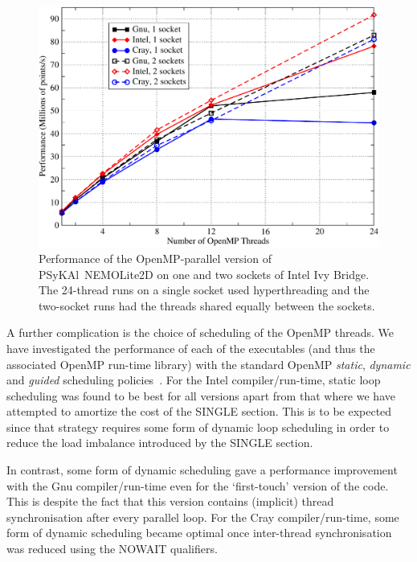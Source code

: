 \documentclass[journal]{IEEEtran}
\newlength{\picwidth}
\newcommand{\psykal}{{PS}y{KA}l}
\begin{document}
\begin{figure}
\centering
\includegraphics[width=\picwidth]{1and2sockets}
\caption{Performance of the OpenMP-parallel version of \psykal\
  NEMOLite2D on one and two sockets of Intel Ivy Bridge. The 24-thread
  runs on a single socket used hyperthreading and the two-socket runs
  had the threads shared equally between the sockets.}
\label{FIG_omp_2socks}
\end{figure}

A further complication is the choice of scheduling of the OpenMP
threads.  We have investigated the performance of each of the
executables (and thus the associated OpenMP run-time library) with the
standard OpenMP {\it static}, {\it dynamic} and {\it guided}
scheduling policies~\cite{openmp_standard}. For the Intel
compiler/run-time, static loop scheduling was found to be best for all
versions apart from that where we have attempted to amortize the cost
of the SINGLE section. This is to be expected since that strategy
requires some form of dynamic loop scheduling in order to reduce the
load imbalance introduced by the SINGLE section.

In contrast, some form of dynamic scheduling gave a performance
improvement with the Gnu compiler/run-time even for the `first-touch'
version of the code. This is despite the fact that this version
contains (implicit) thread synchronisation after every parallel loop.
For the Cray compiler/run-time, some form of dynamic scheduling became
optimal once inter-thread synchronisation was reduced using the NOWAIT
qualifiers.


\end{document}
